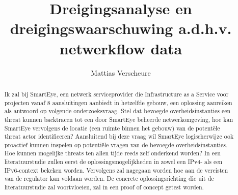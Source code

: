 \documentclass{hogent-article}
\title{Dreigingsanalyse en dreigingswaarschuwing a.d.h.v. netwerkflow data}
\author{Mattias Verscheure}
\begin{document}
\begin{abstract}
    Ik zal bij SmartEye, een netwerk serviceprovider die Infrastructure as a Service voor projecten vanaf 8 aansluitingen aanbiedt in hetzelfde gebouw, een oplossing aanreiken als antwoord op volgende onderzoeksvraag.
     Stel dat bevoegde overheidsinstanties een threat kunnen backtracen tot een door SmartEye beheerde netwerkomgeving, hoe kan SmartEye vervolgens de locatie (een ruimte binnen het gebouw) van de potentële threat actor identificeren? Aansluitend bij deze vraag wil SmartEye logischerwijze ook proactief kunnen inspelen op potentiële vragen van de bevoegde overheidsinstanties. Hoe kunnen mogelijke threats ten allen tijde reeds zelf onderkend worden? In een literatuurstudie zullen eerst de oplossingsmogelijkheden in zowel een IPv4- als een IPv6-context bekeken worden. Vervolgens zal nagegaan worden hoe aan de vereisten van de regulator kan voldaan worden. De concrete oplossingsrichting die uit de literatuurstudie zal voortvloeien, zal in een proof of concept getest worden.
\end{abstract}

\tableofcontents



\printbibliography[heading=bibintoc]
\end{document}
